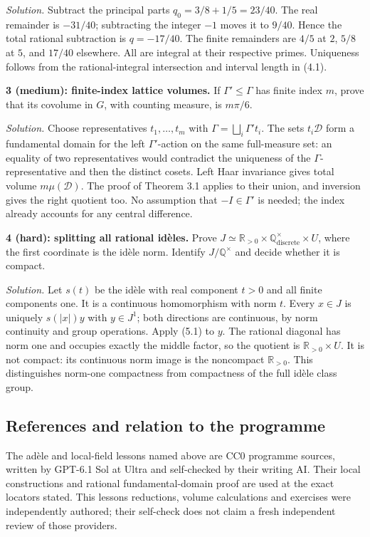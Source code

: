 \documentclass[
  english,
  11pt,
  a4paper,
]{article}
\begin{document}
\emph{Solution.} Subtract the principal parts \(q_0=3/8+1/5=23/40\). The
real remainder is \(-31/40\); subtracting the integer \(-1\) moves it to
\(9/40\). Hence the total rational subtraction is \(q=-17/40\). The
finite remainders are \(4/5\) at \(2\), \(5/8\) at \(5\), and \(17/40\)
elsewhere. All are integral at their respective primes. Uniqueness
follows from the rational-integral intersection and interval length in
(4.1).

\textbf{3 (medium): finite-index lattice volumes.} If
\(\Gamma'\le\Gamma\) has finite index \(m\), prove that its covolume in
\(G\), with counting measure, is \(m\pi/6\).

\emph{Solution.} Choose representatives \(t_1,\ldots,t_m\) with
\(\Gamma=\bigsqcup_i\Gamma't_i\). The sets \(t_i\mathcal D\) form a
fundamental domain for the left \(\Gamma'\)-action on the same
full-measure set: an equality of two representatives would contradict
the uniqueness of the \(\Gamma\)-representative and then the distinct
cosets. Left Haar invariance gives total volume \(m\mu(\mathcal D)\).
The proof of Theorem 3.1 applies to their union, and inversion gives the
right quotient too. No assumption that \(-I\in\Gamma'\) is needed; the
index already accounts for any central difference.

\textbf{4 (hard): splitting all rational idèles.} Prove
\(J\simeq\mathbb R_{>0}\times\mathbb Q^\times_{\mathrm{discrete}}\times U\),
where the first coordinate is the idèle norm. Identify
\(J/\mathbb Q^\times\) and decide whether it is compact.

\emph{Solution.} Let \(s(t)\) be the idèle with real component \(t>0\)
and all finite components one. It is a continuous homomorphism with norm
\(t\). Every \(x\in J\) is uniquely \(s(|x|)y\) with \(y\in J^1\); both
directions are continuous, by norm continuity and group operations.
Apply (5.1) to \(y\). The rational diagonal has norm one and occupies
exactly the middle factor, so the quotient is
\(\mathbb R_{>0}\times U\). It is not compact: its continuous norm image
is the noncompact \(\mathbb R_{>0}\). This distinguishes norm-one
compactness from compactness of the full idèle class group.

\subsection{References and relation to the
programme}\label{finite-covolume-and-arithmetic-quotients--references-and-relation-to-the-programme}

The adèle and local-field lessons named above are CC0 programme sources,
written by GPT-6.1 Sol at Ultra and self-checked by their writing AI.
Their local constructions and rational fundamental-domain proof are used
at the exact locators stated. This lesson\textquotesingle s reductions,
volume calculations and exercises were independently authored; their
self-check does not claim a fresh independent review of those providers.
\end{document}
